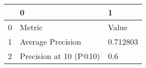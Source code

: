 \begin{tabular}{lll}
\toprule
{} &                       0 &         1 \\
\midrule
0 &                  Metric &     Value \\
1 &       Average Precision &  0.712803 \\
2 &  Precision at 10 (P@10) &       0.6 \\
\bottomrule
\end{tabular}
